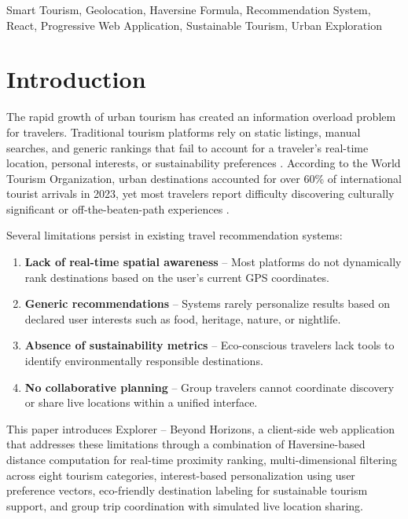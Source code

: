 \documentclass[conference]{IEEEtran}
\begin{document}
\begin{IEEEkeywords}
Smart Tourism, Geolocation, Haversine Formula, Recommendation System, React, Progressive Web Application, Sustainable Tourism, Urban Exploration
\end{IEEEkeywords}

\section{Introduction}

The rapid growth of urban tourism has created an information overload problem for travelers. Traditional tourism platforms rely on static listings, manual searches, and generic rankings that fail to account for a traveler's real-time location, personal interests, or sustainability preferences \cite{gavalas2014}. According to the World Tourism Organization, urban destinations accounted for over 60\% of international tourist arrivals in 2023, yet most travelers report difficulty discovering culturally significant or off-the-beaten-path experiences \cite{unwto2023}.

Several limitations persist in existing travel recommendation systems:

\begin{enumerate}
    \item \textbf{Lack of real-time spatial awareness} -- Most platforms do not dynamically rank destinations based on the user's current GPS coordinates.
    \item \textbf{Generic recommendations} -- Systems rarely personalize results based on declared user interests such as food, heritage, nature, or nightlife.
    \item \textbf{Absence of sustainability metrics} -- Eco-conscious travelers lack tools to identify environmentally responsible destinations.
    \item \textbf{No collaborative planning} -- Group travelers cannot coordinate discovery or share live locations within a unified interface.
\end{enumerate}

This paper introduces Explorer -- Beyond Horizons, a client-side web application that addresses these limitations through a combination of Haversine-based distance computation for real-time proximity ranking, multi-dimensional filtering across eight tourism categories, interest-based personalization using user preference vectors, eco-friendly destination labeling for sustainable tourism support, and group trip coordination with simulated live location sharing.
\end{document}
